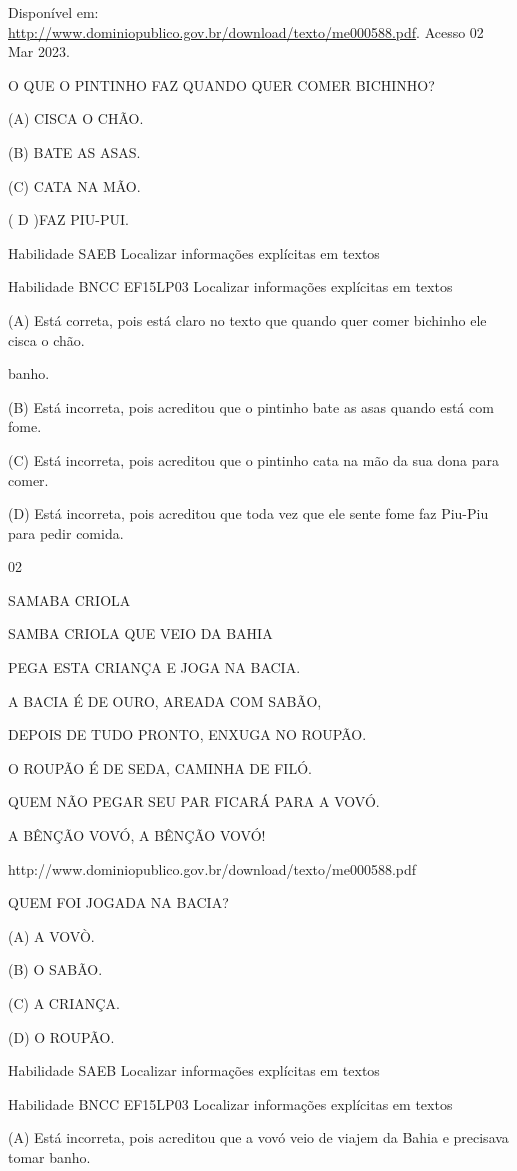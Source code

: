 {{Disponível em:
\url{http://www.dominiopublico.gov.br/download/texto/me000588.pdf}.
Acesso 02 Mar 2023.

O QUE O PINTINHO FAZ QUANDO QUER COMER BICHINHO?

(A) CISCA O CHÃO.

(B) BATE AS ASAS.

(C) CATA NA MÃO.

( D )FAZ PIU-PUI.

Habilidade SAEB Localizar informações explícitas em textos

Habilidade BNCC EF15LP03 Localizar informações explícitas em textos

(A) Está correta, pois está claro no texto que quando quer comer
bichinho ele cisca o chão.

banho.

(B) Está incorreta, pois acreditou que o pintinho bate as asas quando
está com fome.

(C) Está incorreta, pois acreditou que o pintinho cata na mão da sua
dona para comer.

(D) Está incorreta, pois acreditou que toda vez que ele sente fome faz
Piu-Piu para pedir comida.

\num{02}

SAMABA CRIOLA

SAMBA CRIOLA QUE VEIO DA BAHIA

PEGA ESTA CRIANÇA E JOGA NA BACIA.

A BACIA É DE OURO, AREADA COM SABÃO,

DEPOIS DE TUDO PRONTO, ENXUGA NO ROUPÃO.

O ROUPÃO É DE SEDA, CAMINHA DE FILÓ.

QUEM NÃO PEGAR SEU PAR FICARÁ PARA A VOVÓ.

A BÊNÇÃO VOVÓ, A BÊNÇÃO VOVÓ!

http://www.dominiopublico.gov.br/download/texto/me000588.pdf

QUEM FOI JOGADA NA BACIA?

(A) A VOVÒ.

(B) O SABÃO.

(C) A CRIANÇA.

(D) O ROUPÃO.

Habilidade SAEB Localizar informações explícitas em textos

Habilidade BNCC EF15LP03 Localizar informações explícitas em textos

(A) Está incorreta, pois acreditou que a vovó veio de viajem da Bahia e
precisava tomar banho.

}}
